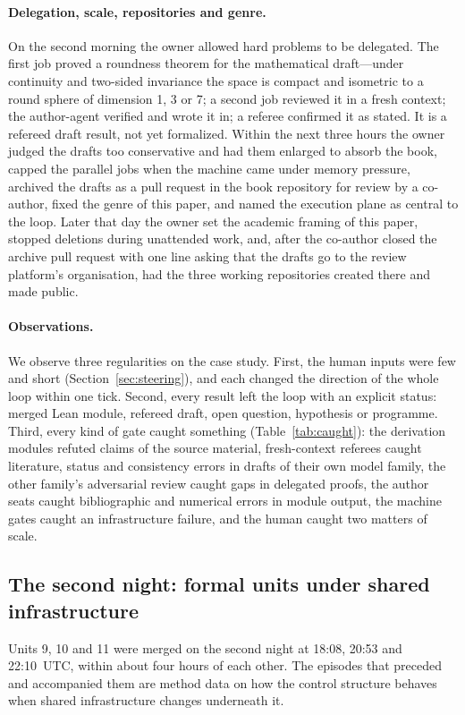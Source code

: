 \documentclass[11pt]{article}
\begin{document}
\paragraph{Delegation, scale, repositories and genre.} On the second morning the
owner allowed hard problems to be delegated. The first job proved a
roundness theorem for the mathematical draft---under continuity and
two-sided invariance the space is compact and isometric to a round sphere of
dimension 1, 3 or 7; a second job reviewed it in a fresh context; the
author-agent verified and wrote it in; a referee confirmed it as stated. It is
a refereed draft result, not yet formalized. Within the next three hours the
owner judged the drafts too conservative and had them enlarged to absorb the
book, capped the parallel jobs when the machine came under memory pressure,
archived the drafts as a pull request in the book repository for review by a
co-author, fixed the genre of this paper, and named the execution plane as
central to the loop. Later that day the owner set the academic framing of
this paper, stopped deletions during unattended work, and, after the co-author
closed the archive pull request with one line asking that the drafts go to the
review platform's organisation, had the three working repositories created
there and made public.

\paragraph{Observations.} We observe three regularities on the case study.
First, the human inputs were few and short (Section~\ref{sec:steering}), and
each changed the direction of the whole loop within one tick. Second, every
result left the loop with an explicit status: merged Lean module, refereed
draft, open question, hypothesis or programme. Third, every kind of gate
caught something (Table~\ref{tab:caught}): the derivation modules refuted
claims of the source material, fresh-context referees caught literature,
status and consistency errors in drafts of their own model family, the other
family's adversarial review caught gaps in delegated proofs, the author seats
caught bibliographic and numerical errors in module output, the machine gates
caught an infrastructure failure, and the human caught two matters of
scale.

\subsection{The second night: formal units under shared infrastructure}
\label{sec:night}
Units 9, 10 and 11 were merged on the second night at 18:08, 20:53 and
22:10~UTC, within about four hours of each other. The episodes that preceded
and accompanied them are method data on how the control structure behaves
when shared infrastructure changes underneath it.
\end{document}
